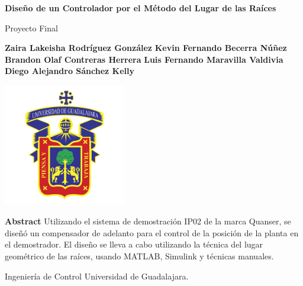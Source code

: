 \documentclass[12pt,a4paper]{article}
\begin{document}
	
	\begin{titlepage}
		\begin{center}
      \vspace{1.5cm}
      
      \huge
      \textbf{Diseño de un Controlador por el Método del Lugar de las Raíces}
      
      \vspace{.5cm}
      
      \large
      Proyecto Final
      
      \vspace{1cm}

      \small
      \textbf{Zaira Lakeisha Rodríguez González} \break
      \textbf{Kevin Fernando Becerra Núñez} \break
      \textbf{Brandon Olaf Contreras Herrera} \break
      \textbf{Luis Fernando Maravilla Valdivia} \break
      \textbf{Diego Alejandro Sánchez Kelly} \break

      \vspace{0.5cm}
      
      \includegraphics[width=0.4\textwidth, keepaspectratio]{./Resources/UDG.png}
      
      \vfill
      
      \begin{center}
        \textbf{Abstract} \break
        Utilizando el sistema de demostración IP02 de la marca Quanser, se diseñó un compensador de adelanto 
        para el control de la posición de la planta en el demostrador. El diseño se lleva a cabo utilizando 
        la técnica del lugar geométrico de las raíces, usando MATLAB, Simulink y técnicas manuales. 
      \end{center}

      \vspace{0.5cm}

      \large
      Ingeniería de Control \break
      Universidad de Guadalajara.

		\end{center}
	\end{titlepage}
\end{document}
